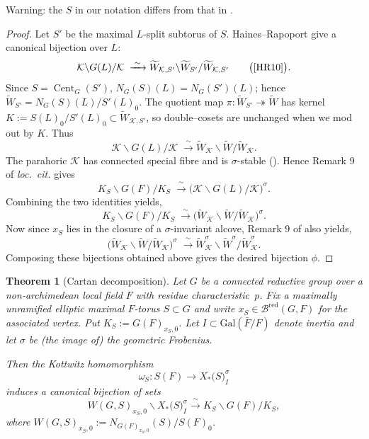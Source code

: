 \documentclass[american]{article}
\numberwithin{equation}{section}
\numberwithin{figure}{section}
\theoremstyle{plain}
\newtheorem{theorem}{Theorem}[section]
\theoremstyle{definition}
\theoremstyle{remark}
\DeclareMathOperator{\Cent}{Cent}
\begin{document}
Warning: the \(S\) in our notation differs from that in \cite{HR10}.
\begin{proof}
Let \(S'\) be the maximal \(L\)-split subtorus of \(S\).
Haines--Rapoport give a canonical bijection over \(L\):
\[
  \mathcal K\backslash G(L)/\mathcal K
  \;\xrightarrow{\;\sim\;}
  \widetilde W_{\mathcal K,S'}\backslash 
  \widetilde W_{S'}/
  \widetilde W_{\mathcal K,S'}
  \qquad
  \bigl(\text{\cite[Prop.\,8]{HR10}}\bigr).
\]
Since \(S=\Cent_G(S')\),
\(N_G(S)(L)=N_G(S')(L)\); hence
\(
  \widetilde W_{S'} = N_G(S)(L)\!/S'(L)_0
\).
The quotient map
\( \pi:\widetilde W_{S'}\twoheadrightarrow\widetilde W \)
has kernel
\(K:=S(L)_0/S'(L)_0\subset\widetilde W_{\mathcal K,S'}\),
so double--cosets are unchanged when we mod out by \(K\).
Thus
\[
  \mathcal K\backslash G(L)/\mathcal K
  \;\xrightarrow{\;\sim\;}
  \widetilde W_{\mathcal K}\backslash 
  \widetilde W/
  \widetilde W_{\mathcal K}.
\]
The parahoric \(\mathcal K\) has connected special fibre and is \(\sigma\)-stable
(\cite[Prop.\,3\,(ii) \& Rem.\,4]{HR10}).
Hence Remark 9 of \emph{loc.~cit.} gives
\[
   K_S\backslash G(F)/K_S
   \;\xrightarrow{\;\sim\;}
   \bigl(\mathcal K\backslash G(L)/\mathcal K\bigr)^{\sigma}.
\]
Combining the two identities yields,
\[
   K_S\backslash G(F)/K_S
   \;\xrightarrow{\;\sim\;}
   \bigl(\widetilde W_{\mathcal K}\backslash 
          \widetilde W/
          \widetilde W_{\mathcal K}\bigr)^{\sigma}.
\]
Now since \(x_S\) lies in the closure of a \(\sigma\)-invariant alcove, Remark 9 of \cite{HR10} also yields,
\[
   \bigl(\widetilde W_{\mathcal K}\backslash 
          \widetilde W/
          \widetilde W_{\mathcal K}\bigr)^{\sigma}
   \;\xrightarrow{\;\sim\;}
   \widetilde W_{\mathcal K}^{\sigma}\backslash 
   \widetilde W^{\sigma}/
   \widetilde W_{\mathcal K}^{\sigma}.
\]
Composing these bijections obtained above gives the desired bijection \(\phi\).
\end{proof}

\begin{theorem}[Cartan decomposition]
\label{thm:KS-double-cosets}
Let $G$ be a connected reductive group over a non-archimedean local field $F$ with residue characteristic~$p$.
Fix a maximally unramified elliptic maximal $F$-torus $S\subset G$ and write $x_S\in\mathcal{B}^{\mathrm{red}}(G,F)$
for the associated vertex. Put $K_S:=G(F)_{x_S,0}$. Let $I\subset\mathrm{Gal}(\bar{F}/F)$ denote inertia and let
$\sigma$ be (the image of) the geometric Frobenius.

Then the Kottwitz homomorphism
\[
  \omega_S \colon S(F) \longrightarrow X_{*}\!\bigl(S\bigr)_{I}^{\sigma}
\]
induces a canonical bijection of sets
\[
  W(G,S)_{x_S,0}\backslash X_{*}\!\bigl(S\bigr)_{I}^{\sigma} \xrightarrow{\;\sim\;} K_S\backslash G(F)/K_S,
\]
where $W(G,S)_{x_S,0}:=N_{G(F)_{x_S,0}}(S)/S(F)_0$.
\end{theorem}
\end{document}
